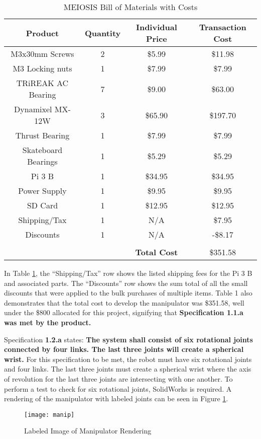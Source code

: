 \begin{table}[htp]
  \centering
  \caption{MEIOSIS Bill of Materials with Costs}
  \label{tab:bom}
  \begin{tabular}{c|c|c|c}
  Product & Quantity & Individual Price & Transaction Cost \\\hline
  M3x30mm Screws & 2 & \$5.99 & \$11.98 \\
  M3 Locking nuts & 1 & \$7.99 & \$7.99 \\
  TRiREAK AC Bearing & 7 & \$9.00 & \$63.00 \\
  Dynamixel MX-12W & 3 & \$65.90 & \$197.70 \\
  Thrust Bearing & 1 & \$7.99 & \$7.99 \\
  Skateboard Bearings & 1 & \$5.29 & \$5.29 \\
  Pi 3 B & 1 & \$34.95 & \$34.95 \\
  Power Supply & 1 & \$9.95 & \$9.95 \\
  SD Card & 1 & \$12.95 & \$12.95 \\
  Shipping/Tax & 1 & N/A & \$7.95 \\
  Discounts & 1 & N/A & -\$8.17 \\
  &&&\\
  & & \textbf{Total Cost} & \$351.58 \\
  \end{tabular}
\end{table}

In Table \ref{tab:bom}, the “Shipping/Tax” row shows the listed shipping fees for the Pi 3 B and associated parts. The “Discounts” row shows the sum total of all the small discounts that were applied to the bulk purchases of multiple items. Table 1 also demonstrates that the total cost to develop the manipulator was \$351.58, well under the \$800 allocated for this project, signifying that \textbf{Specification 1.1.a was met by the product.}


Specification \textbf{1.2.a} states: \textbf{The system shall consist of six rotational joints connected by four links. The last three joints will create a spherical wrist.} For this specification to be met, the robot must have six rotational joints and four links. The last three joints must create a spherical wrist where the axis of revolution for the last three joints are intersecting with one another. To perform a test to check for six rotational joints, SolidWorks is required. A rendering of the manipulator with labeled joints can be seen in Figure \ref{fig:manip}.


\begin{figure}[htp]
  \centering
  \texttt{[image: manip]}
  \caption{Labeled Image of Manipulator Rendering}
  \label{fig:manip}
\end{figure}

